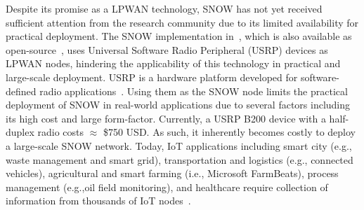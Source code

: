 

Despite its promise as a LPWAN technology, SNOW has not yet received sufficient attention from the research community due to its limited availability for practical deployment.
The SNOW implementation in~\cite{snow_ton}, which is also available as open-source~\cite{snow_bs}, uses Universal Software Radio Peripheral (USRP) devices as LPWAN nodes, hindering the applicability of this technology in practical and large-scale deployment.
USRP is a hardware platform developed for software-defined radio applications~\cite{usrp}. Using them as the SNOW node limits the practical deployment of SNOW in real-world applications due to several factors including its high cost and large form-factor. Currently, a USRP B200 device with a half-duplex radio costs $\approx$ \$750 USD. As such, it inherently becomes costly to deploy a large-scale SNOW network. 
Today, IoT applications including smart city (e.g., waste management and smart grid), transportation and logistics (e.g., connected vehicles), agricultural and smart farming (i.e., Microsoft FarmBeats), process management (e.g.,oil field monitoring), and healthcare require collection of information from thousands of IoT nodes~\cite{ismail2018low}.

